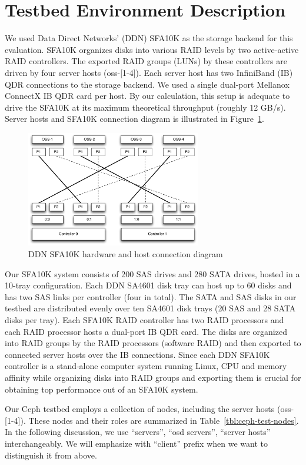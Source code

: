 \section{Testbed Environment Description}
\label{sec:testbed}

We used Data Direct Networks' (DDN) SFA10K as the storage backend for this
evaluation. SFA10K organizes disks into various RAID levels by two
active-active RAID controllers. The exported RAID groups (LUNs) by these
controllers are driven by four server hosts (oss-[1-4]).  Each server host has two InfiniBand
(IB) QDR connections to the storage backend.  We used a single dual-port
Mellanox ConnectX IB QDR card per host.  By our calculation, this setup is
adequate to drive the SFA10K at its maximum theoretical throughput (roughly 12
GB/s). Server hosts and SFA10K connection diagram is illustrated in
Figure~\ref{fig:ddn-sfa10k}.

\begin{figure}[htb]
\centering
\includegraphics[width=3in]{figs/sfa10k}
\caption{DDN SFA10K hardware and host connection diagram}
\label{fig:ddn-sfa10k}
\end{figure}


Our SFA10K system consists of 200 SAS drives and 280 SATA drives, hosted in a
10-tray configuration. Each DDN SA4601 disk tray can host up to 60 disks and
has two SAS links per controller (four in total). The SATA and SAS disks in our
testbed are distributed evenly over ten SA4601 disk trays (20 SAS and 28 SATA
disks per tray). Each SFA10K RAID controller has two RAID processors and each
RAID processor hosts a dual-port IB QDR card. The disks are organized into RAID
groups by the RAID processors (software RAID) and then exported to connected
server hosts over the IB connections. Since each DDN SFA10K controller is a
stand-alone computer system running Linux, CPU and memory affinity while
organizing disks into RAID groups and exporting them is crucial for obtaining
top performance out of an SFA10K system.  

Our Ceph testbed employs a collection of nodes, including the server hosts
(oss-[1-4]). These nodes and their roles are summarized in
Table~\ref{tbl:ceph-test-nodes}. In the following discussion, we use
``servers'', ``osd servers'', ``server hosts'' interchangeably. We will
emphasize with ``client'' prefix when we want to distinguish it from above.


